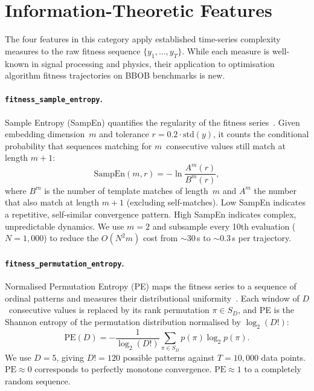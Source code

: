 \section{Information-Theoretic Features}
\label{sec:features:infotheo}

The four features in this category apply established time-series complexity
measures to the raw fitness sequence $\{y_1, \ldots, y_T\}$.  While each
measure is well-known in signal processing and physics, their application to
optimisation algorithm fitness trajectories on BBOB benchmarks is new.

\paragraph{\texttt{fitness\_sample\_entropy}.}
Sample Entropy (SampEn) quantifies the regularity of the fitness
series~\cite{richman2000sampen}.  Given embedding dimension~$m$ and tolerance
$r = 0.2 \cdot \mathrm{std}(y)$, it counts the conditional probability that
sequences matching for $m$~consecutive values still match at length $m+1$:
\begin{equation}
\label{eq:sampen}
  \mathrm{SampEn}(m, r)
    = -\ln \frac{A^m(r)}{B^m(r)},
\end{equation}
where $B^m$ is the number of template matches of length~$m$ and $A^m$ the
number that also match at length $m+1$ (excluding self-matches).  Low SampEn
indicates a repetitive, self-similar convergence pattern. High SampEn indicates
complex, unpredictable dynamics.  We use $m = 2$ and subsample every 10th
evaluation ($N = 1{,}000$) to reduce the $O(N^2 m)$ cost from ${\sim}30$\,s to
${\sim}0.3$\,s per trajectory.

\paragraph{\texttt{fitness\_permutation\_entropy}.}
Normalised Permutation Entropy (PE) maps the fitness series to a sequence of
ordinal patterns and measures their distributional uniformity~\cite{bandt2002permutation}.
Each window of $D$~consecutive values is replaced by its rank permutation
$\pi \in S_D$, and PE is the Shannon entropy of the permutation distribution
normalised by $\log_2(D!)$:
\begin{equation}
\label{eq:pe}
  \mathrm{PE}(D)
    = -\frac{1}{\log_2(D!)}\sum_{\pi \in S_D} p(\pi) \log_2 p(\pi).
\end{equation}
We use $D = 5$, giving $D! = 120$ possible patterns against $T = 10{,}000$
data points.  $\mathrm{PE} \approx 0$ corresponds to perfectly monotone
convergence. $\mathrm{PE} \approx 1$ to a completely random sequence.


